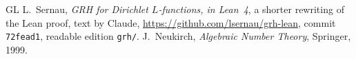 \documentclass[reqno]{amsart}
\theoremstyle{definition}
\theoremstyle{plain}
\theoremstyle{remark}
\begin{document}
\begin{thebibliography}{GL}
 L.~Sernau, \emph{GRH for Dirichlet \(L\)-functions, in Lean~4}, a shorter rewriting of the Lean proof, text by Claude, \url{https://github.com/lsernau/grh-lean}, commit \texttt{72fead1}, readable edition \texttt{grh/}.
 J.~Neukirch, \emph{Algebraic Number Theory}, Springer, 1999.
\end{thebibliography}
\end{document}
